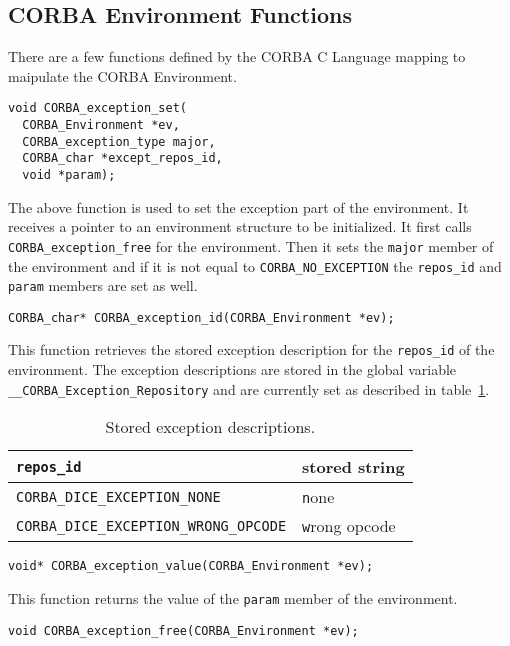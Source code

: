 \subsection{CORBA Environment Functions}

There are a few functions defined by the CORBA C Language 
mapping \cite{corba-clm} to maipulate the CORBA Environment.

\begin{verbatim}
void CORBA_exception_set(
  CORBA_Environment *ev,
  CORBA_exception_type major,
  CORBA_char *except_repos_id,
  void *param);
\end{verbatim}

The above function is used to set the exception part
of the environment. It receives a pointer to an 
environment structure to be initialized. It first calls
\verb|CORBA_exception_free| for the environment. Then
it sets the \verb|major| member of the environment and
if it is not equal to \verb|CORBA_NO_EXCEPTION| the
\verb|repos_id| and \verb|param| members are set as well.

\begin{verbatim}
CORBA_char* CORBA_exception_id(CORBA_Environment *ev);
\end{verbatim}

This function retrieves the stored exception description
for the \verb|repos_id| of the environment. The exception
descriptions are stored in the global variable
\verb|__CORBA_Exception_Repository| and are currently set
as described in table~\ref{tab:reposid}.

\begin{table}[ht]
\caption{\label{tab:reposid} Stored exception descriptions.}
\begin{tabular}{|l|l|} \hline
\verb|repos_id| & stored string \\ \hline \hline
\verb|CORBA_DICE_EXCEPTION_NONE| & {\texttt none} \\ \hline
\verb|CORBA_DICE_EXCEPTION_WRONG_OPCODE| & {\texttt wrong opcode} \\ \hline
\end{tabular}
\end{table}

\begin{verbatim}
void* CORBA_exception_value(CORBA_Environment *ev);
\end{verbatim}

This function returns the value of the \verb|param| member of
the environment.

\begin{verbatim}
void CORBA_exception_free(CORBA_Environment *ev);
\end{verbatim}


